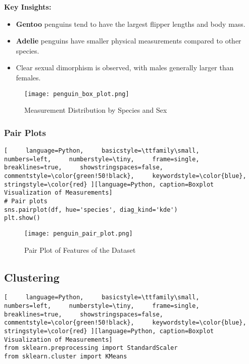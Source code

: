 \documentclass[12pt]{article}
\begin{document}
\begin{itemize}
\textbf{Key Insights:}
\begin{itemize}
    \item \textbf{Gentoo} penguins tend to have the largest flipper lengths and body mass.
    \item \textbf{Adelie} penguins have smaller physical measurements compared to other species.
    \item Clear sexual dimorphism is observed, with males generally larger than females.
\end{itemize}

\begin{figure}[H]
    \centering
    \texttt{[image: penguin\_box\_plot.png]}
    \caption{Measurement Distribution by Species and Sex}
\end{figure}

\subsubsection*{Pair Plots}
\begin{lstlisting}[     language=Python,     basicstyle=\ttfamily\small,     numbers=left,     numberstyle=\tiny,     frame=single,     breaklines=true,     showstringspaces=false,     commentstyle=\color{green!50!black},     keywordstyle=\color{blue},     stringstyle=\color{red} ][language=Python, caption=Boxplot Visualization of Measurements]
# Pair plots
sns.pairplot(df, hue='species', diag_kind='kde')
plt.show()

\end{lstlisting}

\begin{figure}[H]
    \centering
    \texttt{[image: penguin\_pair\_plot.png]}
    \caption{Pair Plot of Features of the Dataset}
\end{figure}

\subsection*{Clustering}
\begin{lstlisting}[     language=Python,     basicstyle=\ttfamily\small,     numbers=left,     numberstyle=\tiny,     frame=single,     breaklines=true,     showstringspaces=false,     commentstyle=\color{green!50!black},     keywordstyle=\color{blue},     stringstyle=\color{red} ][language=Python, caption=Boxplot Visualization of Measurements]
from sklearn.preprocessing import StandardScaler
from sklearn.cluster import KMeans


\end{lstlisting}
\end{itemize}
\end{document}
